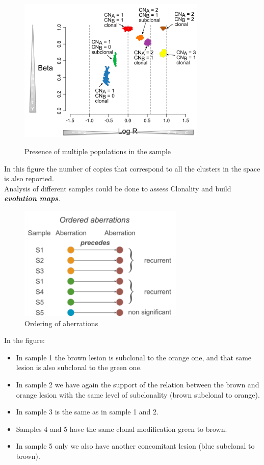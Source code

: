 \begin{figure}[H]
  \caption{Presence of multiple populations in the sample}
  \centering
  \includegraphics[width=0.8\textwidth]{image3}
  \label{fig: }
\end{figure}

In this figure the number of copies that correspond to all the clusters in the
space is also reported. \\

Analysis of different samples could be done to assess Clonality and build \emph{\textbf{evolution maps}}.

\begin{figure}[ht]
  \caption{Ordering of aberrations}
  \centering
  \includegraphics[width=0.7\textwidth]{image4}
\end{figure}

In the figure:
\begin{itemize}
\item
  In sample 1 the brown lesion is subclonal to the orange one, and that same
  lesion is also subclonal to the green one.
\item
  In sample 2 we have again the support of the relation between the brown and
  orange lesion with the same level of subclonality (brown subclonal to orange).
\item
  In sample 3 is the same as in sample 1 and 2.
\item
  Samples 4 and 5 have the same clonal modification green to brown.
\item
  In sample 5 only we also have another concomitant lesion (blue subclonal to
  brown).
\end{itemize}

